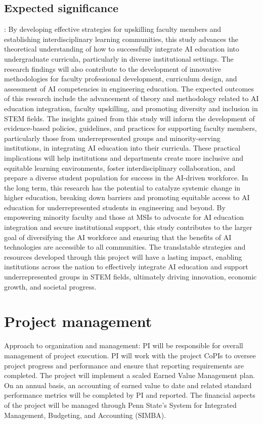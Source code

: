 \documentclass[11pt]{article}
\begin{document}
\subsection{Expected significance}: 
By developing effective strategies for upskilling faculty members and establishing interdisciplinary learning communities, this study advances the theoretical understanding of how to successfully integrate AI education into undergraduate curricula, particularly in diverse institutional settings. The research findings will also contribute to the development of innovative methodologies for faculty professional development, curriculum design, and assessment of AI competencies in engineering education. The expected outcomes of this research include the advancement of theory and methodology related to AI education integration, faculty upskilling, and promoting diversity and inclusion in STEM fields. The insights gained from this study will inform the development of evidence-based policies, guidelines, and practices for supporting faculty members, particularly those from underrepresented groups and minority-serving institutions, in integrating AI education into their curricula. These practical implications will help institutions and departments create more inclusive and equitable learning environments, foster interdisciplinary collaboration, and prepare a diverse student population for success in the AI-driven workforce. In the long term, this research has the potential to catalyze systemic change in higher education, breaking down barriers and promoting equitable access to AI education for underrepresented students in engineering and beyond. By empowering minority faculty and those at MSIs to advocate for AI education integration and secure institutional support, this study contributes to the larger goal of diversifying the AI workforce and ensuring that the benefits of AI technologies are accessible to all communities. The translatable strategies and resources developed through this project will have a lasting impact, enabling institutions across the nation to effectively integrate AI education and support underrepresented groups in STEM fields, ultimately driving innovation, economic growth, and societal progress.

\section{Project management}
Approach to organization and management: PI will be responsible for overall management of project execution.  PI will work with the project CoPIs to oversee project progress and performance and ensure that reporting requirements are completed.  The project will implement a scaled Earned Value Management plan. On an annual basis, an accounting of earned value to date and related standard performance metrics will be completed by PI and reported. The financial aspects of the project will be managed through Penn State’s System for Integrated Management, Budgeting, and Accounting (SIMBA). 
\end{document}
